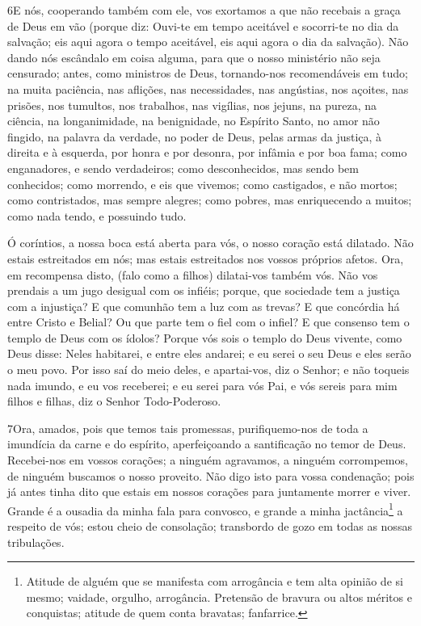 \lettrine{6} E nós, cooperando também com ele, vos exortamos a
que não recebais a graça de Deus em vão (porque diz: Ouvi-te em
tempo aceitável e socorri-te no dia da salvação; eis aqui agora o
tempo aceitável, eis aqui agora o dia da salvação). Não dando
nós escândalo em coisa alguma, para que o nosso ministério não seja
censurado; antes, como ministros de Deus, tornando-nos
recomendáveis em tudo; na muita paciência, nas aflições, nas
necessidades, nas angústias, nos açoites, nas prisões, nos
tumultos, nos trabalhos, nas vigílias, nos jejuns, na pureza, na
ciência, na longanimidade, na benignidade, no Espírito Santo, no
amor não fingido, na palavra da verdade, no poder de Deus, pelas
armas da justiça, à direita e à esquerda, por honra e por
desonra, por infâmia e por boa fama; como enganadores, e sendo
verdadeiros; como desconhecidos, mas sendo bem conhecidos; como
morrendo, e eis que vivemos; como castigados, e não mortos;
como contristados, mas sempre alegres; como pobres, mas
enriquecendo a muitos; como nada tendo, e possuindo tudo.

Ó coríntios, a nossa boca está aberta para vós, o nosso coração
está dilatado. Não estais estreitados em nós; mas estais
estreitados nos vossos próprios afetos. Ora, em recompensa
disto, (falo como a filhos) dilatai-vos também vós. Não vos
prendais a um jugo desigual com os infiéis; porque, que sociedade
tem a justiça com a injustiça? E que comunhão tem a luz com as
trevas? E que concórdia há entre Cristo e Belial? Ou que
parte tem o fiel com o infiel? E que consenso tem o templo de
Deus com os ídolos? Porque vós sois o templo do Deus vivente, como
Deus disse: Neles habitarei, e entre eles andarei; e eu serei o seu
Deus e eles serão o meu povo. Por isso saí do meio deles, e
apartai-vos, diz o Senhor; e não toqueis nada imundo, e eu vos
receberei; e eu serei para vós Pai, e vós sereis para mim
filhos e filhas, diz o Senhor Todo-Poderoso.

\medskip

\lettrine{7} Ora, amados, pois que temos tais promessas,
purifiquemo-nos de toda a imundícia da carne e do espírito,
aperfeiçoando a santificação no temor de Deus. Recebei-nos em
vossos corações; a ninguém agravamos, a ninguém corrompemos, de
ninguém buscamos o nosso proveito. Não digo isto para vossa
condenação; pois já antes tinha dito que estais em nossos corações
para juntamente morrer e viver. Grande é a ousadia da minha fala
para convosco, e grande a minha jactância\footnote{Atitude de alguém
que se manifesta com arrogância e tem alta opinião de si mesmo;
vaidade, orgulho, arrogância. Pretensão de bravura ou altos méritos
e conquistas; atitude de quem conta bravatas; fanfarrice.} a
respeito de vós; estou cheio de consolação; transbordo de gozo em
todas as nossas tribulações.

